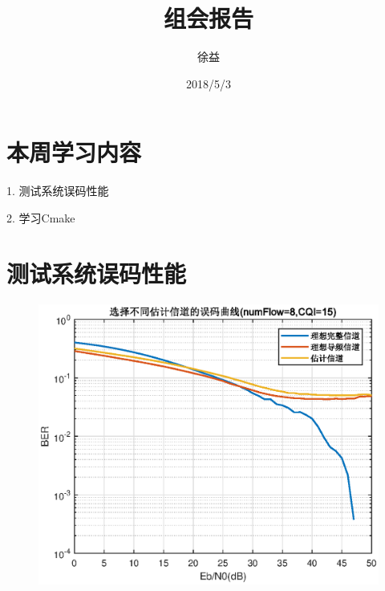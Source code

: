 \documentclass{article}
\title{组会报告}
\author{徐益}
\date{2018/5/3}
\begin{document}
	
\maketitle


\section{本周学习内容}

1. 测试系统误码性能

2. 学习Cmake

\section{测试系统误码性能}
\begin{figure}[H]
	\centering
	\includegraphics[width = .6\textwidth]{plot/plot_CQI15.eps}
\end{figure}
\end{document}
